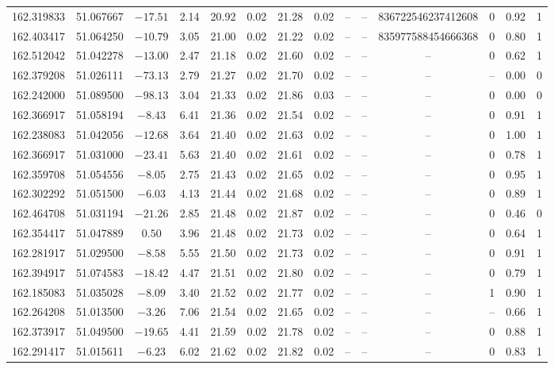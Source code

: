 \begin{tabular}{ccccccccccccc}
162.319833 & 51.067667 & $-17.51$ & 2.14 & 20.92 & 0.02 & 21.28 & 0.02 & -- & -- & 836722546237412608 & 0 & 0.92 & 1 \\
162.403417 & 51.064250 & $-10.79$ & 3.05 & 21.00 & 0.02 & 21.22 & 0.02 & -- & -- & 835977588454666368 & 0 & 0.80 & 1 \\
162.512042 & 51.042278 & $-13.00$ & 2.47 & 21.18 & 0.02 & 21.60 & 0.02 & -- & -- & -- & 0 & 0.62 & 1 \\
162.379208 & 51.026111 & $-73.13$ & 2.79 & 21.27 & 0.02 & 21.70 & 0.02 & -- & -- & -- & -- & 0.00 & 0 \\
162.242000 & 51.089500 & $-98.13$ & 3.04 & 21.33 & 0.02 & 21.86 & 0.03 & -- & -- & -- & 0 & 0.00 & 0 \\
162.366917 & 51.058194 & $-8.43$ & 6.41 & 21.36 & 0.02 & 21.54 & 0.02 & -- & -- & -- & 0 & 0.91 & 1 \\
162.238083 & 51.042056 & $-12.68$ & 3.64 & 21.40 & 0.02 & 21.63 & 0.02 & -- & -- & -- & 0 & 1.00 & 1 \\
162.366917 & 51.031000 & $-23.41$ & 5.63 & 21.40 & 0.02 & 21.61 & 0.02 & -- & -- & -- & 0 & 0.78 & 1 \\
162.359708 & 51.054556 & $-8.05$ & 2.75 & 21.43 & 0.02 & 21.65 & 0.02 & -- & -- & -- & 0 & 0.95 & 1 \\
162.302292 & 51.051500 & $-6.03$ & 4.13 & 21.44 & 0.02 & 21.68 & 0.02 & -- & -- & -- & 0 & 0.89 & 1 \\
162.464708 & 51.031194 & $-21.26$ & 2.85 & 21.48 & 0.02 & 21.87 & 0.02 & -- & -- & -- & 0 & 0.46 & 0 \\
162.354417 & 51.047889 & $0.50$ & 3.96 & 21.48 & 0.02 & 21.73 & 0.02 & -- & -- & -- & 0 & 0.64 & 1 \\
162.281917 & 51.029500 & $-8.58$ & 5.55 & 21.50 & 0.02 & 21.73 & 0.02 & -- & -- & -- & 0 & 0.91 & 1 \\
162.394917 & 51.074583 & $-18.42$ & 4.47 & 21.51 & 0.02 & 21.80 & 0.02 & -- & -- & -- & 0 & 0.79 & 1 \\
162.185083 & 51.035028 & $-8.09$ & 3.40 & 21.52 & 0.02 & 21.77 & 0.02 & -- & -- & -- & 1 & 0.90 & 1 \\
162.264208 & 51.013500 & $-3.26$ & 7.06 & 21.54 & 0.02 & 21.65 & 0.02 & -- & -- & -- & -- & 0.66 & 1 \\
162.373917 & 51.049500 & $-19.65$ & 4.41 & 21.59 & 0.02 & 21.78 & 0.02 & -- & -- & -- & 0 & 0.88 & 1 \\
162.291417 & 51.015611 & $-6.23$ & 6.02 & 21.62 & 0.02 & 21.82 & 0.02 & -- & -- & -- & 0 & 0.83 & 1 \\

\end{tabular}
